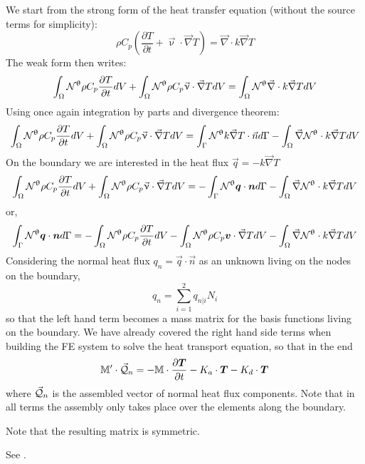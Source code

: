 We start from the strong form of the heat transfer equation (without the source terms for simplicity):
\[
\rho C_p
\left(\frac{\partial T}{\partial t} + \vec{\upnu}\cdot \vec{\nabla}T\right)
=
\vec{\nabla} \cdot k\vec{\nabla} T
\]
The weak form then writes:
\[
\int_\Omega {\mathcal{N}}^\uptheta
\rho C_p
\frac{\partial T}{\partial t} dV 
+
\int_\Omega {\mathcal{N}}^\uptheta
\rho C_p
\vec{\upnu}\cdot \vec{\nabla}T  dV
=
\int_\Omega {\mathcal{N}}^\uptheta
\vec{\nabla} \cdot k\vec{\nabla} T dV
\]
Using once again integration by parts and divergence theorem:
\[
\int_\Omega {\mathcal{N}}^\uptheta
\rho C_p
\frac{\partial T}{\partial t} dV 
+
\int_\Omega {\mathcal{N}}^\uptheta
\rho C_p
\vec{\upnu}\cdot \vec{\nabla}T  dV
=
\int_\Gamma {\mathcal{N}}^\uptheta k \vec{\nabla} T \cdot \vec{n} d\Gamma
-
\int_\Omega  \vec{\nabla} {\mathcal{N}}^\uptheta \cdot k \vec{\nabla} T dV
\]
On the boundary we are interested in the heat flux $\vec{q}=-k \vec{\nabla} T$
\[
\int_\Omega {\mathcal{N}}^\uptheta
\rho C_p
\frac{\partial T}{\partial t} dV 
+
\int_\Omega {\mathcal{N}}^\uptheta
\rho C_p
\vec{\upnu}\cdot \vec{\nabla} T  dV
=
-\int_\Gamma {\mathcal{N}}^\uptheta {\bm q} \cdot {\bm n} d\Gamma
- \int_\Omega  \vec{\nabla} {\mathcal{N}}^\uptheta \cdot k \vec{\nabla} T dV
\]
or,
\[
\int_\Gamma {\mathcal{N}}^\uptheta {\bm q} \cdot {\bm n} d\Gamma
=
-\int_\Omega {\mathcal{N}}^\uptheta
\rho C_p
\frac{\partial T}{\partial t} dV 
-
\int_\Omega {\mathcal{N}}^\uptheta
\rho C_p  {\bm v}\cdot \vec{\nabla} T  dV
- \int_\Omega  \vec{\nabla} {\mathcal{N}}^\uptheta \cdot k \vec{\nabla} T dV
\]
Considering the normal heat flux $q_n = \vec{q} \cdot \vec{n}$ as an unknown 
living on the nodes on the boundary, 
\[
q_n = \sum_{i=1}^2 q_{n|i} N_i
\]
so that the left hand term becomes a mass matrix for the basis functions living on 
the boundary.
We have already covered the right hand side terms when building the FE system 
to solve the heat transport equation, so that in the end 
\[
{\mathbb{M}}' \cdot \vec{\cal Q}_n =
- {\mathbb{M}} \cdot \frac{\partial \bm T}{\partial t} -K_a \cdot {\bm T} - K_d \cdot {\bm T} 
\]
where $\vec{\cal Q}_n$ is the assembled vector of normal heat flux components.
Note that in all terms the assembly only takes place over the elements along the boundary.


Note that the resulting matrix is symmetric.

See .
